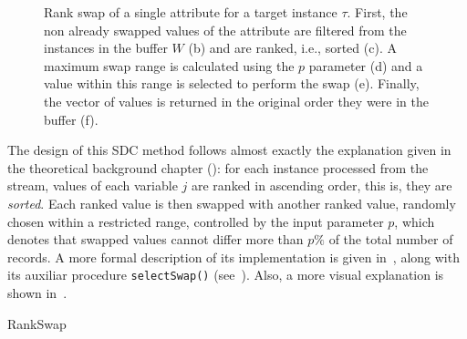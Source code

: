 \begin{figure}
\centering
{}
\caption[Rank swap of an attribute.]{Rank swap of a single attribute for a target instance $\tau$. First, the non already swapped values of the attribute are filtered from the instances in the buffer $W$ (b) and are ranked, i.e., sorted (c). A maximum swap range is calculated using the $p$ parameter (d) and a value within this range is selected to perform the swap (e). Finally, the vector of values is returned in the original order they were in the buffer (f).}
\label{fig:rank-swapping-schematic-2}
\end{figure}

The design of this SDC method follows almost exactly the explanation given in the theoretical background chapter (): for each instance processed from the stream, values of each variable $j$ are ranked in ascending order, this is, they are \textit{sorted}. Each ranked value is then swapped with another ranked value, randomly chosen within a restricted range, controlled by the input parameter $p$, which denotes that swapped values cannot differ more than $p\%$ of the total number of records. A more formal description of its implementation is given in~, along with its auxiliar procedure \texttt{selectSwap()} (see~). Also, a more visual explanation is shown in~.

\begin{algorithm}[H]
\caption{RankSwap\label{al:rank-swapping}}
\end{algorithm}

